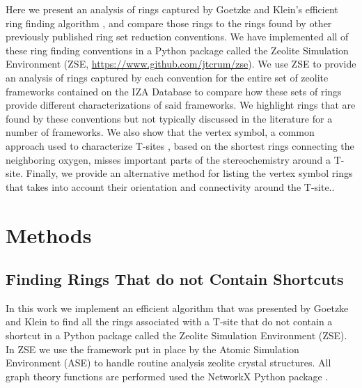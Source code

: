 \documentclass[preprint,numrefs,noinfo,sort&compress]{elsarticle}
\begin{document}
Here we present an analysis of rings captured by Goetzke and Klein's efficient ring finding algorithm \cite{goetzke-properties-1991}, and compare those rings to the rings found by other previously published ring set reduction conventions. We have implemented all of these ring finding conventions in a Python package called the Zeolite Simulation Environment (ZSE, \url{https://www.github.com/jtcrum/zse}). We use ZSE to provide an analysis of rings captured by each convention for the entire set of zeolite frameworks contained on the IZA Database \cite{baerlocher-database-nodate} to compare how these sets of rings provide different characterizations of said frameworks. We highlight rings that are found by these conventions but not typically discussed in the literature for a number of frameworks. We also show that the vertex symbol, a common approach used to characterize T-sites \cite{okeeffe-vertex-1997}, based on the shortest rings connecting the neighboring oxygen, misses important parts of the stereochemistry around a T-site. Finally, we provide an alternative method for listing the vertex symbol rings that takes into account their orientation and connectivity around the T-site.. 

\section{Methods}
\label{sec:orgd626155}

\subsection{Finding Rings That do not Contain Shortcuts \label{section:goetzke}}
\label{sec:org18323f6}

In this work we implement an efficient algorithm that was presented by Goetzke and Klein to find all the rings associated with a T-site that do not contain a shortcut \cite{goetzke-properties-1991} in a Python package called the Zeolite Simulation Environment (ZSE). In ZSE we use the framework put in place by the Atomic Simulation Environment (ASE) \cite{hjorth-larsen-atomic-2017} to handle routine analysis zeolite crystal structures. All graph theory functions are performed used the NetworkX Python package \cite{hagberg-exploring-2008}. 
\end{document}
